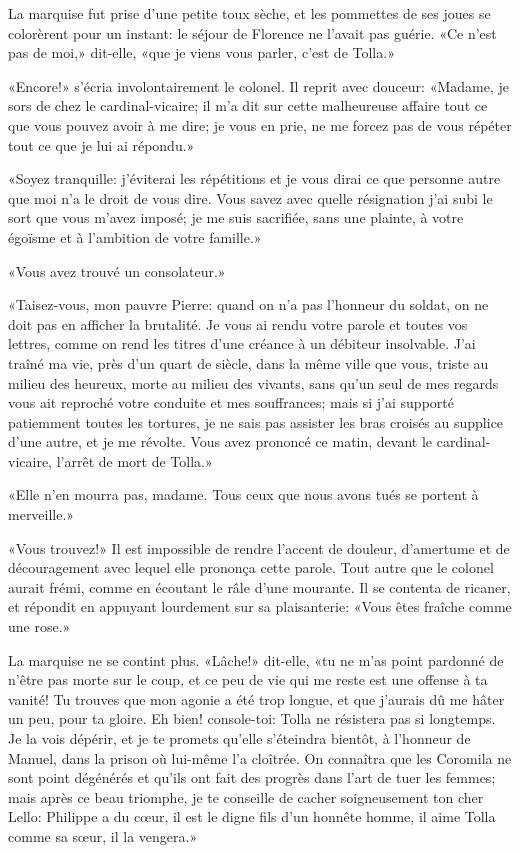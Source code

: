 La marquise fut prise d'une petite toux sèche, et les pommettes de ses joues se colorèrent pour un instant: le séjour de Florence ne l'avait pas guérie. «Ce n'est pas de moi,» dit-elle, «que je viens vous parler, c'est de Tolla.»

«Encore!» s'écria involontairement le colonel. Il reprit avec douceur: «Madame, je sors de chez le cardinal-vicaire; il m'a dit sur cette malheureuse affaire tout ce que vous pouvez avoir à me dire; je vous en prie, ne me forcez pas de vous répéter tout ce que je lui ai répondu.»

«Soyez tranquille: j'éviterai les répétitions et je vous dirai ce que personne autre que moi n'a le droit de vous dire. Vous savez avec quelle résignation j'ai subi le sort que vous m'avez imposé; je me suis sacrifiée, sans une plainte, à votre égoïsme et à l'ambition de votre famille.»

«Vous avez trouvé un consolateur.»

«Taisez-vous, mon pauvre Pierre: quand on n'a pas l'honneur du soldat, on ne doit pas en afficher la brutalité. Je vous ai rendu votre parole et toutes vos lettres, comme on rend les titres d'une créance à un débiteur insolvable. J'ai traîné ma vie, près d'un quart de siècle, dans la même ville que vous, triste au milieu des heureux, morte au milieu des vivants, sans qu'un seul de mes regards vous ait reproché votre conduite et mes souffrances; mais si j'ai supporté patiemment toutes les tortures, je ne sais pas assister les bras croisés au supplice d'une autre, et je me révolte. Vous avez prononcé ce matin, devant le cardinal-vicaire, l'arrêt de mort de Tolla.»

«Elle n'en mourra pas, madame. Tous ceux que nous avons tués se portent à merveille.»

«Vous trouvez!» Il est impossible de rendre l'accent de douleur, d'amertume et de découragement avec lequel elle prononça cette parole. Tout autre que le colonel aurait frémi, comme en écoutant le râle d'une mourante. Il se contenta de ricaner, et répondit en appuyant lourdement sur sa plaisanterie: «Vous êtes fraîche comme une rose.»

La marquise ne se contint plus. «Lâche!» dit-elle, «tu ne m'as point pardonné de n'être pas morte sur le coup, et ce peu de vie qui me reste est une offense à ta vanité! Tu trouves que mon agonie a été trop longue, et que j'aurais dû me hâter un peu, pour ta gloire. Eh bien! console-toi: Tolla ne résistera pas si longtemps. Je la vois dépérir, et je te promets qu'elle s'éteindra bientôt, à l'honneur de Manuel, dans la prison où lui-même l'a cloîtrée. On connaîtra que les Coromila ne sont point dégénérés et qu'ils ont fait des progrès dans l'art de tuer les femmes; mais après ce beau triomphe, je te conseille de cacher soigneusement ton cher Lello: Philippe a du c\oe{}ur, il est le digne fils d'un honnête homme, il aime Tolla comme sa s\oe{}ur, il la vengera.»


